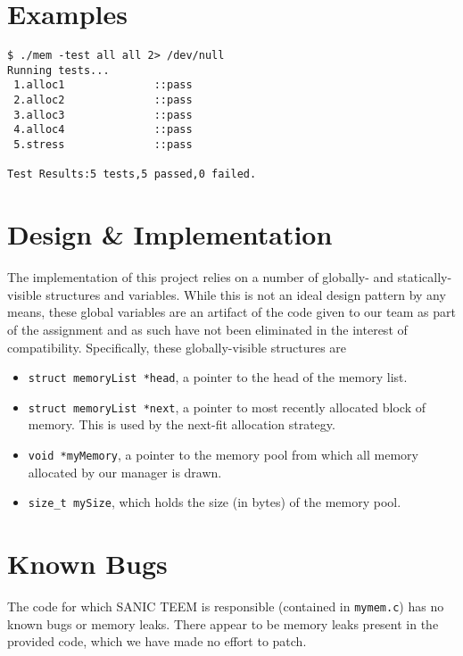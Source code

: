 \documentclass[paper=a4, fontsize=11pt]{scrartcl}
\begin{document}
\section*{Examples}
\begin{lstlisting}[style=ShellStyle]
$ ./mem -test all all 2> /dev/null
Running tests...
 1.alloc1              ::pass
 2.alloc2              ::pass
 3.alloc3              ::pass
 4.alloc4              ::pass
 5.stress              ::pass

Test Results:5 tests,5 passed,0 failed.
\end{lstlisting}

\section*{Design \& Implementation}
The implementation of this project relies on a number of globally- and statically-visible structures and variables. While this is not an ideal design pattern by any means, these global variables are an artifact of the code given to our team as part of the assignment and as such have not been eliminated in the interest of compatibility. Specifically, these globally-visible structures are

\begin{itemize}
  \item \texttt{struct memoryList *head}, a pointer to the head of the memory list.
  \item \texttt{struct memoryList *next}, a pointer to most recently allocated block of memory. This is used by the next-fit allocation strategy.
  \item \texttt{void *myMemory}, a pointer to the memory pool from which all memory allocated by our manager is drawn.
  \item \texttt{size\_t mySize}, which holds the size (in bytes) of the memory pool.
\end{itemize}

\section*{Known Bugs}
The code for which SANIC TEEM is responsible (contained in \texttt{mymem.c}) has no known bugs or memory leaks. There appear to be memory leaks present in the provided code, which we have made no effort to patch.
\end{document}
